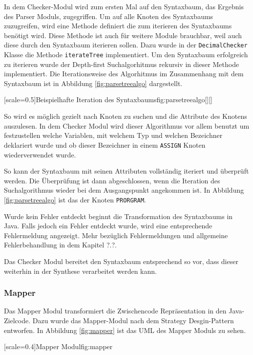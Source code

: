 In dem Checker-Modul wird zum ersten Mal auf den Syntaxbaum, das Ergebnis des Parser Moduls, zugegriffen.
Um auf alle Knoten des Syntaxbaums zuzugreifen, wird eine Methode definiert die zum iterieren des Syntaxbaums benötigt wird.
Diese Methode ist auch für weitere Module brauchbar, weil auch diese durch den Syntaxbaum iterieren sollen.
Dazu wurde in der \verb+DecimalChecker+ Klasse die Methode \verb+iterateTree+ implementiert.
Um den Syntaxbaum erfolgreich zu iterieren wurde der Depth-first Suchalgorhitmus rekursiv in dieser Methode implementiert.
Die Iterationsweise des Algorhitmus im Zusammenhang mit dem Syntaxbaum ist in Abbildung \ref{fig:parsetreealgo} dargestellt.

[scale=0.5]{Beispielhafte Iteration des Syntaxbaums}{fig:parsetreealgo}[][]
\pagebreak

So wird es möglich gezielt nach Knoten zu suchen und die Attribute des Knotens auszulesen.
In dem Checker Modul wird dieser Algorithmus vor allem benutzt um festzustellen welche Variablen, mit welchem Typ und welchen Bezeichner deklariert wurde und ob dieser Bezeichner in einem \verb+ASSIGN+ Knoten wiederverwendet wurde.

So kann der Syntaxbaum mit seinen Attributen vollständig iteriert und überprüft werden.
Die Überprüfung ist dann abgeschlossen, wenn die Iteration des Suchalgorithmus wieder bei dem Ausgangspunkt angekommen ist. In Abbildung \ref{fig:parsetreealgo} ist das der Knoten \verb+PRORGRAM+.

Wurde kein Fehler entdeckt beginnt die Transformation des Syntaxbaums in Java. Falls jedoch ein Fehler entdeckt wurde, wird eine entsprechende Fehlermeldung angezeigt.
Mehr bezüglich Fehlermeldungen und allgemeine Fehlerbehandlung in dem Kapitel ?.?.

Das Checker Modul bereitet den Syntaxbaum entsprechend so vor, dass dieser weiterhin in der Synthese verarbeitet werden kann.
 
\subsubsection{Mapper}
Das Mapper Modul transformiert die Zwischencode Repräsentation in den Java-Zielcode. Dazu wurde das Mapper-Modul nach dem Strategy Desgin-Pattern entworfen.
In Abbildung \ref{fig:mapper} ist das UML des Mapper Moduls zu sehen. 


[scale=0.4]{Mapper Modul}{fig:mapper}
\pagebreak

